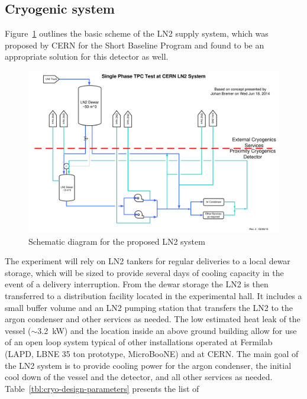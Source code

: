 \subsection{Cryogenic system}

Figure~\ref{fig:proposed-LN2-system} outlines the basic scheme of the LN2 supply system, which was 
proposed by CERN for the Short Baseline Program and found to be an appropriate solution for this 
detector as well. 
%
\begin{figure}[htb]
\begin{center}
\includegraphics[width=.95\textwidth]{figures/proposed-LN2-system} 
\caption[Schematic diagram for the proposed LN2 system.]{\label{fig:proposed-LN2-system}Schematic diagram for the proposed LN2 system}
\end{center}
\end{figure}
%
The experiment will rely on LN2 tankers for regular deliveries to a local dewar storage, 
which will be sized to provide several days of cooling capacity in the event of a delivery interruption. 
From the dewar storage the LN2 is then transferred to a distribution facility located in the experimental 
hall. It includes a small buffer volume and an LN2 pumping station that transfers the LN2 to the argon 
condenser and other services as needed. The low estimated heat leak of the vessel ($\sim$3.2~kW) and the 
location inside an above ground building allow for use of an open loop system typical of other 
installations operated at Fermilab (LAPD, LBNE 35 ton prototype, MicroBooNE) and at CERN. 
The main goal of the LN2 system is to provide cooling power for the argon condenser, the initial cool down of 
the vessel and the detector, and all other services as needed.
%
 Table~\ref{tbl:cryo-design-parameters} presents the list of 
